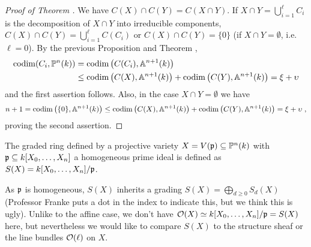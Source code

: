 \documentclass[a4paper,parskip=half,numbers=enddot, DIV=12, headheight=30pt]{scrreprt}
\begin{document}
\begin{proof}[Proof of Theorem ]
    We have $C(X)\cap C(Y) = C(X\cap Y)$. If $X\cap Y= \bigcup_{i=1}^\ell C_i$ is the decomposition of $X\cap Y$ into irreducible components, $C(X)\cap C(Y) = \bigcup_{i=1}^\ell C(C_i)$ or $C(X) \cap C(Y) = \{0\}$ (if $X\cap Y=\emptyset$, i.e.\ $\ell=0$). By the previous Proposition and Theorem , 
    \begin{align*}
    	 \operatorname{codim}(C_i, \mathbb{P}^n(k)) &= \operatorname{codim}\big(C(C_i), \mathbb{A}^{n+1}(k)\big)\\
    	 & \leq \operatorname{codim}\big(C(X), \mathbb{A}^{n+1}(k)\big) +\operatorname{codim}\big(C(Y), \mathbb{A}^{n+1}(k)\big)= \xi+\upsilon 
    \end{align*}
   and the first assertion follows. Also, in the case $X\cap Y =\emptyset$ we have 
   \begin{align*}
	   	n+1 = \operatorname{codim}\big(\{0\}, \mathbb{A}^{n+1}(k)\big) \leq \operatorname{codim}\big(C(X),\mathbb{A}^{n+1}(k)\big)+\operatorname{codim}\big(C(Y), \mathbb{A}^{n+1}(k)\big) = \xi +\upsilon\;, 
   \end{align*}
   proving the second assertion.
\end{proof}
\begin{defi}
    The graded ring defined by a projective variety $X= V(\mathfrak{p}) \subseteq \mathbb{P}^n(k)$ with $\mathfrak{p}\subseteq k[X_0,\ldots,X_n]$ a homogeneous prime ideal is defined as $S(X) = k[X_0,\ldots, X_n]/\mathfrak{p}$. 
\end{defi}
As $\mathfrak{p}$ is homogeneous, $S(X)$ inherits a grading $S(X)=\bigoplus_{d\geq 0}S_d(X)$ (Professor Franke puts a dot in the index to indicate this, but we think this is ugly). Unlike to the affine case, we don't have $\mathcal{O}(X)\simeq k[X_0,\ldots,X_n]/\mathfrak{p}=S(X)$ here, but nevertheless we would like to compare $S(X)$ to the structure sheaf or the line bundles $\mathcal{O}(\ell)$ on $X$.
\end{document}
